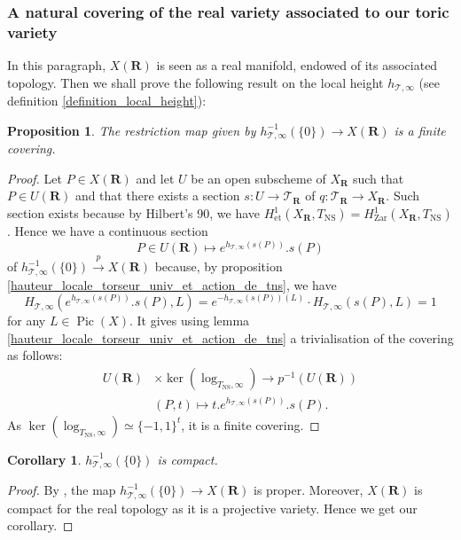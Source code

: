 \documentclass{proc-l}
\newcommand{\R}{\mathbf{R}}
\DeclareMathOperator{\Pic}{Pic}
\DeclareMathOperator{\NS}{NS}
\newcommand{\stackT}{\mathcal{T}}
\newtheorem{cor}[theorem]{Corollary}
\newtheorem{prop}[theorem]{Proposition}
\theoremstyle{definition}
\theoremstyle{remark}
\numberwithin{equation}{section}
\begin{document}
\subsubsection{A natural covering of the real variety associated to our toric variety}

In this paragraph, $X(\R)$ is seen as a real manifold, endowed of its associated topology. Then we shall prove the following result on the local height $h_{\stackT,\infty}$ (see definition \ref{definition_local_height}):

\begin{prop}
    The restriction map given by $h_{\stackT,\infty}^{-1}(\{0\}) \rightarrow X(\R)$ is a finite covering.
\end{prop}

\begin{proof}
    Let $P \in X(\R)$ and let $U$ be an open subscheme of $X_{\R}$ such that $P \in U(\R)$ and that there exists a section $s : U \rightarrow \stackT_{\R}$ of $q : \stackT_{\R} \rightarrow X_{\R}$. Such section exists because by Hilbert's 90, we have $H^1_{\text{et}}(X_{\R},T_{\NS}) = H^1_{\text{Zar}}(X_{\R},T_{\NS})$. Hence we have a continuous section $$P \in U(\R) \longmapsto e^{h_{\stackT,\infty}(s(P))} . s(P)$$ of $h_{\stackT,\infty}^{-1}(\{0\}) \xrightarrow{p} X(\R)$ because, by proposition \ref{hauteur_locale_torseur_univ_et_action_de_tns}, we have $$H_{\stackT,\infty}(e^{h_{\stackT,\infty}(s(P))} . s(P),L) = e^{-h_{\stackT,\infty}(s(P))(L)} \cdot H_{\stackT,\infty}(s(P),L) = 1 $$for any $L \in \Pic(X)$. It gives using lemma \ref{hauteur_locale_torseur_univ_et_action_de_tns} a trivialisation of the covering as follows:
    \begin{align*}
        U(\R) &\times \ker(\log_{T_{\NS},\infty}) \rightarrow p^{-1}(U(\R)) \\
        &(P,t) \longmapsto t.e^{h_{\stackT,\infty}(s(P))}. s(P).
    \end{align*}
    As $\ker(\log_{T_{\NS},\infty}) \simeq \{-1,1\}^t$, it is a finite covering.
\end{proof}

\begin{cor}\label{corollaire_compacite}
    $h_{\stackT,\infty}^{-1}(\{0\}) $ is compact.
\end{cor}

\begin{proof}
    By \cite[chapitre I, §4, n°5, théorème 1]{bourbaki2016topologie}, the map $h_{\stackT,\infty}^{-1}(\{0\}) \rightarrow X(\R)$ is proper. Moreover, $X(\R)$ is compact for the real topology as it is a projective variety. Hence we get our corollary.
\end{proof}
\end{document}
